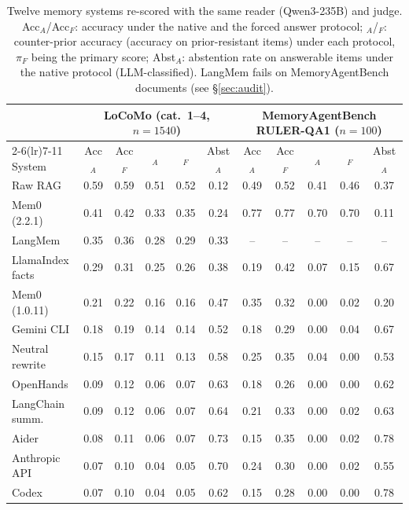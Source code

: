 \begin{table}[t]
\centering\small
\begin{tabular}{l ccccc ccccc}
\toprule
& \multicolumn{5}{c}{LoCoMo (cat.\ 1--4, $n{=}1540$)} & \multicolumn{5}{c}{MemoryAgentBench RULER-QA1 ($n{=}100$)} \\
\cmidrule(lr){2-6}\cmidrule(lr){7-11}
System & Acc$_A$ & Acc$_F$ & \cpr{}$_A$ & \cpr{}$_F$ & Abst$_A$ & Acc$_A$ & Acc$_F$ & \cpr{}$_A$ & \cpr{}$_F$ & Abst$_A$ \\
\midrule
Raw RAG & 0.59 & 0.59 & 0.51 & 0.52 & 0.12 & 0.49 & 0.52 & 0.41 & 0.46 & 0.37 \\
Mem0 (2.2.1) & 0.41 & 0.42 & 0.33 & 0.35 & 0.24 & 0.77 & 0.77 & 0.70 & 0.70 & 0.11 \\
LangMem & 0.35 & 0.36 & 0.28 & 0.29 & 0.33 & -- & -- & -- & -- & -- \\
LlamaIndex facts & 0.29 & 0.31 & 0.25 & 0.26 & 0.38 & 0.19 & 0.42 & 0.07 & 0.15 & 0.67 \\
Mem0 (1.0.11) & 0.21 & 0.22 & 0.16 & 0.16 & 0.47 & 0.35 & 0.32 & 0.00 & 0.02 & 0.20 \\
Gemini CLI & 0.18 & 0.19 & 0.14 & 0.14 & 0.52 & 0.18 & 0.29 & 0.00 & 0.04 & 0.67 \\
Neutral rewrite & 0.15 & 0.17 & 0.11 & 0.13 & 0.58 & 0.25 & 0.35 & 0.04 & 0.00 & 0.53 \\
OpenHands & 0.09 & 0.12 & 0.06 & 0.07 & 0.63 & 0.18 & 0.26 & 0.00 & 0.00 & 0.62 \\
LangChain summ. & 0.09 & 0.12 & 0.06 & 0.07 & 0.64 & 0.21 & 0.33 & 0.00 & 0.02 & 0.63 \\
Aider & 0.08 & 0.11 & 0.06 & 0.07 & 0.73 & 0.15 & 0.35 & 0.00 & 0.02 & 0.78 \\
Anthropic API & 0.07 & 0.10 & 0.04 & 0.05 & 0.70 & 0.24 & 0.30 & 0.00 & 0.02 & 0.55 \\
Codex & 0.07 & 0.10 & 0.04 & 0.05 & 0.62 & 0.15 & 0.28 & 0.00 & 0.00 & 0.78 \\
\bottomrule
\end{tabular}
\caption{Twelve memory systems re-scored with the same reader (Qwen3-235B) and judge. Acc$_A$/Acc$_F$: accuracy under the native
and the forced answer protocol; \cpr{}$_A$/\cpr{}$_F$: counter-prior accuracy (accuracy on prior-resistant items) under each protocol, $\pi_F$ being the primary score; Abst$_A$: abstention rate on answerable
items under the native protocol (LLM-classified). LangMem fails on MemoryAgentBench documents (see \S\ref{sec:audit}).}
\label{tab:protocols}
\end{table}
